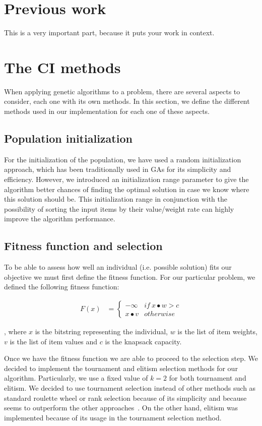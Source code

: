\documentclass[anon]{CI}
\begin{document}
\section{Previous work}

This is a very important part, because it puts your work in context.

\section{The CI methods}\label{sec:ci-methods}
When applying genetic algorithms to a problem, there are several aspects to consider, each one with its own methods. In this section, we define the different methods used in our implementation for each one of these aspects.

\subsection{Population initialization}
For the initialization of the population, we have used a random initialization approach, which has been traditionally used in GAs for its simplicity and efficiency. However, we introduced an initialization range parameter to give the algorithm better chances of finding the optimal solution in case we know where this solution should be. This initialization range in conjunction with the possibility of sorting the input items by their value/weight rate can highly improve the algorithm performance.

\subsection{Fitness function and selection}
To be able to assess how well an individual (i.e. possible solution) fits our objective we must first define the fitness function. For our particular problem, we defined the following fitness function:

\begin{align*}
F(x) & =\begin{cases}
-\infty & if\:x\bullet w>c\\
x\bullet v & otherwise
\end{cases}
\end{align*}

\noindent, where $x$ is the bitstring representing the individual, $w$ is the list of item weights, $v$ is the list of item values and $c$ is the knapsack capacity.

Once we have the fitness function we are able to proceed to the selection step. We decided to implement the tournament and elitism selection methods for our algorithm. Particularly, we use a fixed value of $k=2$ for both tournament and elitism. We decided to use tournament selection instead of other methods such as standard roulette wheel or rank selection because of its simplicity and because seems to outperform the other approaches~\cite{razali2011genetic}. On the other hand, elitism was implemented because of its usage in the tournament selection method.
\end{document}
